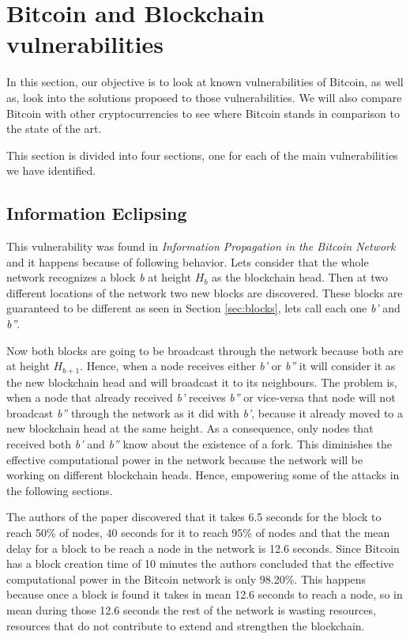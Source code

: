 


\section{Bitcoin and Blockchain vulnerabilities}
\label{sec:vulnerabilities}
In this section, our objective is to look at known vulnerabilities of Bitcoin, as well as, look into the solutions proposed to those vulnerabilities. We will also compare Bitcoin with other cryptocurrencies to see where Bitcoin stands in comparison to the state of the art. 

This section is divided into four sections, one for each of the main vulnerabilities we have identified.

\subsection{Information Eclipsing}
\label{sec:ieclipsing}
This vulnerability was found in \textit{Information Propagation in the Bitcoin Network} \cite{decker2013information} and it happens because of following behavior. Lets consider that the whole network recognizes a block \textit{b} at height $H_b$ as the blockchain head. Then at two different locations of the network two new blocks are discovered. These blocks are guaranteed to be different as seen in Section \ref{sec:blocks}, lets call each one \textit{b'} and \textit{b''}. 

Now both blocks are going to be broadcast through the network because both are at height $H_{b+1}$. Hence, when a node receives either \textit{b'} or \textit{b''} it will consider it as the new blockchain head and will broadcast it to its neighbours. The problem is, when a node that already received \textit{b'} receives \textit{b''} or vice-versa that node will not broadcast \textit{b''} through the network as it did with \textit{b'}, because it already moved to a new blockchain head at the same height. As a consequence, only nodes that received both \textit{b'} and \textit{b''} know about the existence of a fork. This diminishes the effective computational power in the network because the network will be working on different blockchain heads. Hence, empowering some of the attacks in the following sections.

The authors of the paper discovered that it takes 6.5 seconds for the block to reach 50\% of nodes, 40 seconds for it to reach 95\% of nodes and that the mean delay for a block to be reach a node in the network is 12.6 seconds. Since Bitcoin has a block creation time of 10 minutes the authors concluded that the effective computational power in the Bitcoin network is only 98.20\%. This happens because once a block is found it takes in mean 12.6 seconds to reach a node, so in mean during those 12.6 seconds the rest of the network is wasting resources, resources that do not contribute to extend and strengthen the blockchain.

